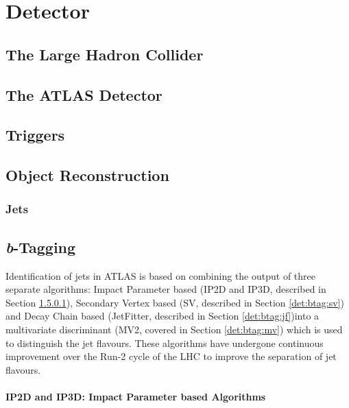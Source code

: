 \chapter{Detector}\label{c:Det}

\section{The Large Hadron Collider}

\section{The ATLAS Detector}

\section{Triggers}

\section{Object Reconstruction}
	
	\subsection{Jets}
	
	\subsection{\bjets}

\section{\textit{b}-Tagging}
\label{det:btagging}

	Identification of \bquark jets in ATLAS is based on combining the output of three separate \btag algorithms: Impact Parameter based (IP2D and IP3D, described in Section \ref{det:btag:ip}), Secondary Vertex based (SV, described in Section \ref{det:btag:sv}) and Decay Chain based (JetFitter, described in Section \ref{det:btag:jf})into a multivariate discriminant (MV2, covered in Section \ref{det:btag:mv}) which is used to distinguish the jet flavours. These algorithms have undergone continuous improvement over the Run-2 cycle of the LHC to improve the separation of jet flavours. 
	
	\subsubsection{IP2D and IP3D: Impact Parameter based Algorithms}
		\label{det:btag:ip}
		
